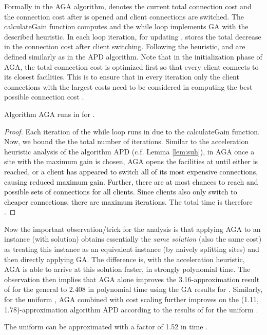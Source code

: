 \documentclass[10pt]{llncs}
\begin{document}
Formally in the AGA algorithm,  denotes the current total connection
cost and  the connection cost after  is opened and client
connections are switched. The calculateGain function computes 
and the while loop implements GA with the described heuristic. In
each loop iteration, for updating ,  stores the total
decrease in the connection cost after client switching. Following
the heuristic,  and  are defined similarly as in the APD
algorithm. Note that in the initialization phase of AGA, the total
connection cost is optimized first so that every client connects to
its closest facilities. This is to ensure that in every iteration
only the client connections with the largest costs need to be considered
in computing the best possible connection cost .
\begin{lemma}
Algorithm AGA runs in  for .\label{lem:time-GA}\end{lemma}
\begin{proof}
Each iteration of the while loop runs in 
due to the calculateGain function. Now, we bound the the total number
of iterations. Similar to the acceleration heuristic analysis of the
algorithm APD (c.f. Lemma \ref{lem:suh}), in AGA once a site 
with the maximum gain is chosen, AGA opens the facilities at 
until either  is reached, or \textcolor{black}{a client
has appeared to switch all of its most expensive connections, causing
reduced maximum gain. Further, there are at most  chances
to reach }\textcolor{black}{{} and  possible
sets of connections for all clients. Since clients also only switch
to cheaper connections, there are maximum 
iterations.} The total time is therefore .
\end{proof}
Now the important observation/trick for the analysis is that applying
AGA to an  instance (with solution) obtains essentially
the \textit{same solution} (also the same cost) as treating this instance
as an equivalent  instance (by naively splitting sites) and
then directly applying GA. The difference is, with the acceleration
heuristic, AGA is able to arrive at this solution faster, in strongly
polynomial time. The observation then implies that AGA alone improves
the 3.16-approximation result of \cite{yan2011approximation} for
the general  to 2.408 in polynomial time using the
GA results \cite{Guha03FTFL2.41} for . Similarly, for the
uniform , AGA combined with cost scaling further improves on
the (1.11, 1.78)-approximation algorithm APD according to the results
of \cite{Swamy08FTFL2.076} for the uniform .
\begin{theorem}
The uniform  can be approximated with a factor of 1.52 in time
. \label{thm:1.52uniform}
\end{theorem}
\end{document}
